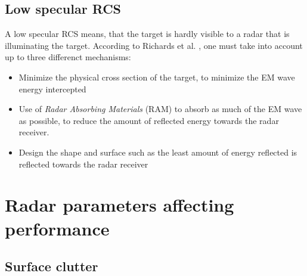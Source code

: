 \subsection{Low specular RCS}
A low specular RCS means, that the target is hardly visible to a radar that is illuminating the target. According to Richards et al. \citep{richards2010principles}, one must take into account up to three differenct mechanisms:
\begin{itemize}
	\item Minimize the physical cross section of the target, to minimize the EM wave energy intercepted
	\item Use of \textit{Radar Absorbing Materials} (RAM) to absorb as much of the EM wave as possible, to reduce the amount of reflected energy towards the radar receiver.
	\item Design the shape and surface such as the least amount of energy reflected is reflected towards the radar receiver
\end{itemize}


\section{Radar parameters affecting performance}

\subsection{Surface clutter}
\label{sec:surfaceClutter}


